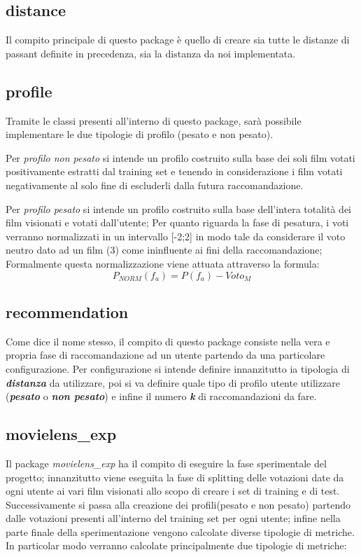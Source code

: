 \subsection{distance}
Il compito principale di questo package è quello di creare sia tutte le distanze di passant definite in precedenza, sia la distanza da noi implementata.
\subsection{profile}
Tramite le classi presenti all'interno di questo package, sarà possibile implementare le due tipologie di profilo (pesato e non pesato).

Per \emph{profilo non pesato} si intende un profilo costruito sulla base dei soli film votati positivamente estratti dal training set e tenendo in considerazione i film votati negativamente al solo fine di escluderli dalla futura raccomandazione.

Per \emph{profilo pesato} si intende un profilo costruito sulla base dell'intera totalità dei film visionati e votati dall'utente; Per quanto riguarda la fase di pesatura, i voti verranno normalizzati in un intervallo [-2;2] in modo tale da considerare il voto neutro dato ad un film (3) come ininfluente ai fini della raccomandazione; Formalmente questa normalizzazione viene attuata attraverso la formula:
$$
P_{NORM}(f_a) = P(f_a)- Voto_M
$$
\subsection{recommendation}
Come dice il nome stesso, il compito di questo package consiste nella vera e propria fase di raccomandazione ad un utente partendo da una particolare configurazione. Per configurazione si intende definire innanzitutto ia tipologia di \emph{\textbf{distanza}} da utilizzare, poi si va definire quale tipo di profilo utente utilizzare (\emph{\textbf{pesato}} o \emph{\textbf{non pesato}}) e infine il numero \emph{\textbf{k}} di raccomandazioni da fare.
\subsection{movielens\_exp}
Il package \emph{movielens\_exp} ha il compito di eseguire la fase sperimentale del progetto; innanzitutto viene eseguita la fase di splitting delle votazioni date da ogni utente ai vari film visionati allo scopo di creare i set di training e di test. Successivamente si passa alla creazione dei profili(pesato e non pesato) partendo dalle votazioni presenti all'interno del training set per ogni utente; infine nella parte finale della sperimentazione vengono calcolate diverse tipologie di metriche. In particolar modo verranno calcolate principalmente due tipologie di metriche:

